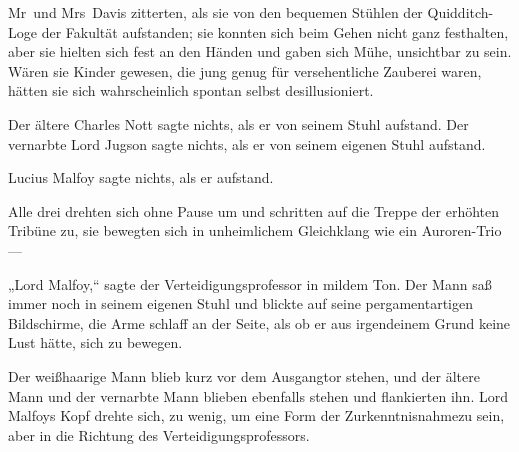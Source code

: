\later

Mr~und Mrs~Davis zitterten, als sie von den bequemen Stühlen der Quidditch-Loge der Fakultät aufstanden; sie konnten sich beim Gehen nicht ganz festhalten, aber sie hielten sich fest an den Händen und gaben sich Mühe, unsichtbar zu sein. Wären sie Kinder gewesen, die jung genug für versehentliche Zauberei waren, hätten sie sich wahrscheinlich spontan selbst desillusioniert.

Der ältere Charles Nott sagte nichts, als er von seinem Stuhl aufstand. Der vernarbte Lord Jugson sagte nichts, als er von seinem eigenen Stuhl aufstand.

Lucius Malfoy sagte nichts, als er aufstand.

Alle drei drehten sich ohne Pause um und schritten auf die Treppe der erhöhten Tribüne zu, sie bewegten sich in unheimlichem Gleichklang wie ein Auroren-Trio—

„Lord Malfoy,“ sagte der Verteidigungsprofessor in mildem Ton. Der Mann saß immer noch in seinem eigenen Stuhl und blickte auf seine pergamentartigen Bildschirme, die Arme schlaff an der Seite, als ob er aus irgendeinem Grund keine Lust hätte, sich zu bewegen.

Der weißhaarige Mann blieb kurz vor dem Ausgangtor stehen, und der ältere Mann und der vernarbte Mann blieben ebenfalls stehen und flankierten ihn. Lord Malfoys Kopf drehte sich, zu wenig, um eine Form der Zurkenntnisnahmezu sein, aber in die Richtung des Verteidigungsprofessors.

